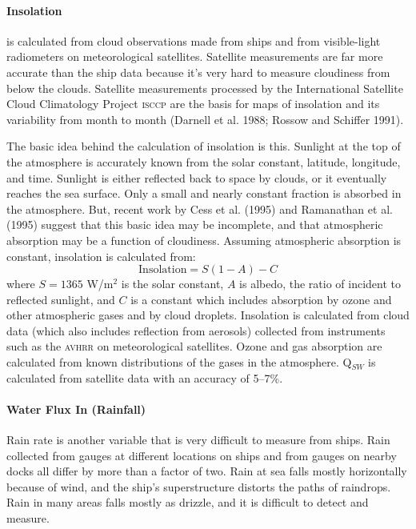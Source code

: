 \paragraph{Insolation}
 is calculated from cloud observations made from
ships and from visible-light radiometers on meteorological satellites. Satellite
measurements are far more accurate than the ship data because it's very hard to
measure cloudiness from below the clouds. Satellite measurements processed
by the International Satellite Cloud Climatology Project \textsc{isccp} are the
basis for maps of insolation and its variability from month to month
(Darnell et al. 1988; Rossow and Schiffer 1991).

The basic idea behind the calculation of insolation is this. Sunlight at the top of the atmosphere is accurately known from the solar
constant, latitude, longitude, and time. Sunlight is
either reflected back to space by clouds, or it eventually reaches the sea surface. Only a
small and nearly constant fraction is absorbed in the atmosphere. But, recent work by Cess et
al. (1995) and Ramanathan et al. (1995) suggest that this basic idea may be incomplete, and
that atmospheric absorption may be a function of cloudiness. Assuming atmospheric absorption is
constant, insolation is calculated from:
\[
\text{Insolation} = S (1 - A) - C
\]
where $S = 1365$ W/m$^2$ is the solar constant, $A$ is albedo,
the ratio of incident to reflected sunlight, and $C$ is a constant which includes absorption
by ozone and other atmospheric gases and by cloud droplets. Insolation is
calculated from cloud data (which also includes reflection from aerosols)
collected from instruments such as the \textsc{avhrr} on meteorological satellites.
Ozone and gas absorption are calculated from known distributions of the gases
in the atmosphere. Q$_{SW}$ is calculated from satellite data with an
accuracy of 5--7\%.

\paragraph{Water Flux In (Rainfall)}
Rain rate is another variable
that is very difficult to measure from ships. Rain collected from gauges at
different locations on ships and from gauges on nearby docks all differ by more
than a factor of two. Rain at sea falls mostly horizontally because of wind, and
the ship's superstructure distorts the paths of raindrops. Rain in many areas falls
mostly as drizzle, and it is difficult to detect and measure.

